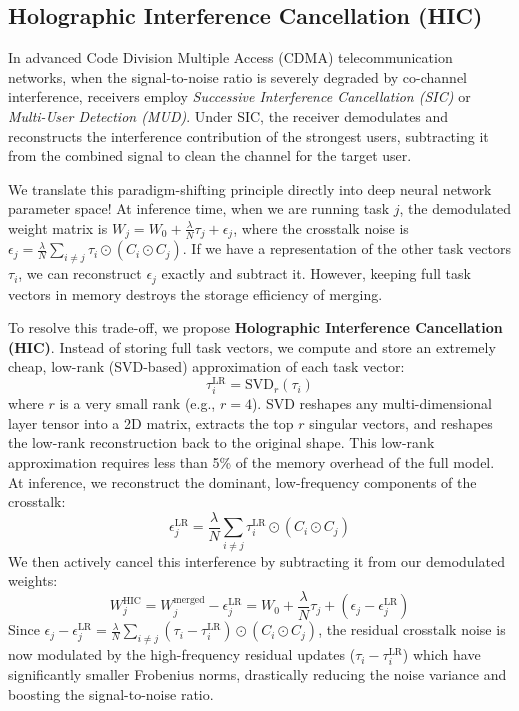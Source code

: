 \documentclass{article}
\begin{document}
\subsection{Holographic Interference Cancellation (HIC)}
\label{sec:hic}
In advanced Code Division Multiple Access (CDMA) telecommunication networks, when the signal-to-noise ratio is severely degraded by co-channel interference, receivers employ \textit{Successive Interference Cancellation (SIC)} or \textit{Multi-User Detection (MUD)}. Under SIC, the receiver demodulates and reconstructs the interference contribution of the strongest users, subtracting it from the combined signal to clean the channel for the target user.

We translate this paradigm-shifting principle directly into deep neural network parameter space! At inference time, when we are running task $j$, the demodulated weight matrix is $W_j = W_0 + \frac{\lambda}{N} \tau_j + \epsilon_j$, where the crosstalk noise is $\epsilon_j = \frac{\lambda}{N} \sum_{i \neq j} \tau_i \odot (C_i \odot C_j)$. If we have a representation of the other task vectors $\tau_i$, we can reconstruct $\epsilon_j$ exactly and subtract it. However, keeping full task vectors in memory destroys the storage efficiency of merging.

To resolve this trade-off, we propose \textbf{Holographic Interference Cancellation (HIC)}. Instead of storing full task vectors, we compute and store an extremely cheap, low-rank (SVD-based) approximation of each task vector:
\begin{equation}
    \tau_i^{\text{LR}} = \text{SVD}_r(\tau_i)
\end{equation}
where $r$ is a very small rank (e.g., $r = 4$). SVD reshapes any multi-dimensional layer tensor into a 2D matrix, extracts the top $r$ singular vectors, and reshapes the low-rank reconstruction back to the original shape. This low-rank approximation requires less than 5\% of the memory overhead of the full model. At inference, we reconstruct the dominant, low-frequency components of the crosstalk:
\begin{equation}
    \epsilon_j^{\text{LR}} = \frac{\lambda}{N} \sum_{i \neq j} \tau_i^{\text{LR}} \odot (C_i \odot C_j)
\end{equation}
We then actively cancel this interference by subtracting it from our demodulated weights:
\begin{equation}
    W_j^{\text{HIC}} = W_j^{\text{merged}} - \epsilon_j^{\text{LR}} = W_0 + \frac{\lambda}{N} \tau_j + (\epsilon_j - \epsilon_j^{\text{LR}})
\end{equation}
Since $\epsilon_j - \epsilon_j^{\text{LR}} = \frac{\lambda}{N} \sum_{i \neq j} (\tau_i - \tau_i^{\text{LR}}) \odot (C_i \odot C_j)$, the residual crosstalk noise is now modulated by the high-frequency residual updates ($\tau_i - \tau_i^{\text{LR}}$) which have significantly smaller Frobenius norms, drastically reducing the noise variance and boosting the signal-to-noise ratio.
\end{document}
